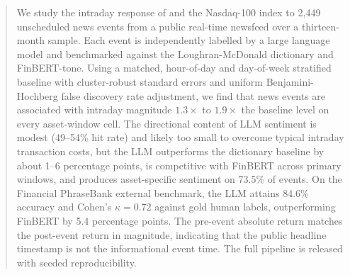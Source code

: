 \begin{abstract}
\noindent
We study the intraday response of \eurusd{} and the Nasdaq-100 index
to 2{,}449 unscheduled news events from a public real-time newsfeed
over a thirteen-month sample. Each event is independently labelled by
a large language model and benchmarked against the Loughran-McDonald
dictionary and FinBERT-tone. Using a matched, hour-of-day and
day-of-week stratified baseline with cluster-robust standard errors
and uniform Benjamini-Hochberg false discovery rate adjustment, we
find that news events are associated with intraday magnitude
$1.3\times$ to $1.9\times$ the baseline level on every asset-window
cell. The directional content of LLM sentiment is modest (49--54\%
hit rate) and likely too small to overcome typical intraday
transaction costs, but the LLM
outperforms the dictionary baseline by about 1--6 percentage points,
is competitive with FinBERT across primary windows, and produces
asset-specific sentiment on 73.5\% of events. On the
Financial PhraseBank external benchmark, the LLM attains 84.6\%
accuracy and Cohen's $\kappa = 0.72$ against gold human labels,
outperforming FinBERT by 5.4 percentage points. The pre-event
absolute return matches the post-event return in magnitude,
indicating that the public headline timestamp is not the
informational event time. The full pipeline is released with seeded
reproducibility.
\end{abstract}
